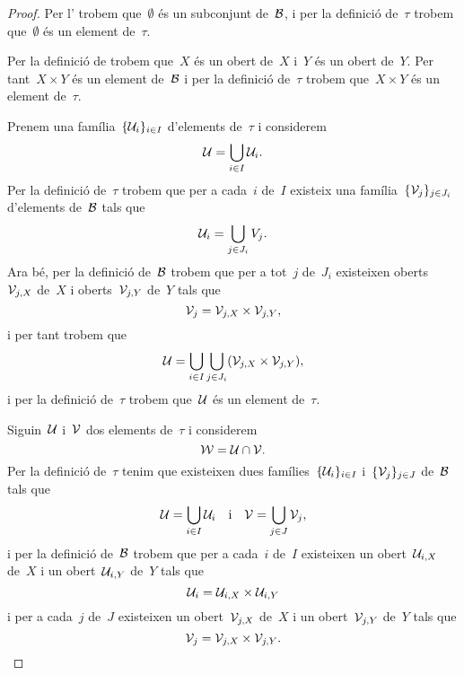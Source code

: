 \documentclass[../../main.tex]{subfiles}
\begin{document}
    \begin{proof}
        Per l' trobem que~\(\emptyset\) és un subconjunt de~\(\mathcal{B}\), i per la definició de~\(\tau\) trobem que~\(\emptyset\) és un element de~\(\tau\).

        Per la definició de  trobem que~\(X\) és un obert de~\(X\) i~\(Y\) és un obert de~\(Y\).
        Per tant~\(X\times Y\) és un element de~\(\mathcal{B}\) i per la definició de~\(\tau\) trobem que~\(X\times Y\) és un element de~\(\tau\).

        Prenem una família~\(\{\mathcal{U}_{i}\}_{i\in I}\) d'elements de~\(\tau\) i considerem
        \[
            \mathcal{U}=\bigcup_{i\in I}\mathcal{U}_{i}.
        \]
        Per la definició de~\(\tau\) trobem que per a cada~\(i\) de~\(I\) existeix una família~\(\{\mathcal{V}_{j}\}_{j\in J_{i}}\) d'elements de~\(\mathcal{B}\) tals que
        \[
            \mathcal{U}_{i}=\bigcup_{j\in J_{i}}V_{j}.
        \]
        Ara bé, per la definició de~\(\mathcal{B}\) trobem que per a tot~\(j\) de~\(J_{i}\) existeixen oberts~\(\mathcal{V}_{j,X}\) de~\(X\) i oberts~\(\mathcal{V}_{j,Y}\) de~\(Y\) tals que
        \[
            \mathcal{V}_{j}=\mathcal{V}_{j,X}\times\mathcal{V}_{j,Y},
        \]
        i per tant trobem que
        \[
            \obert{U}=\bigcup_{i\in I}\bigcup_{j\in J_{i}}\left(\obert{V}_{j,X}\times\obert{V}_{j,Y}\right),
        \]
        i per la definició de~\(\tau\) trobem que~\(\mathcal{U}\) és un element de~\(\tau\).

        Siguin~\(\mathcal{U}\) i~\(\mathcal{V}\) dos elements de~\(\tau\) i considerem
        \[
            \mathcal{W}=\mathcal{U}\cap\mathcal{V}.
        \]
        Per la definició de~\(\tau\) tenim que existeixen dues famílies~\(\{\mathcal{U}_{i}\}_{i\in I}\) i~\(\{\mathcal{V}_{j}\}_{j\in J}\) de~\(\mathcal{B}\) tals que
        \[
            \mathcal{U}=\bigcup_{i\in I}\mathcal{U}_{i}\quad\text{i}\quad\mathcal{V}=\bigcup_{j\in J}\mathcal{V}_{j},
        \]
        i per la definició de~\(\mathcal{B}\) trobem que per a cada~\(i\) de~\(I\) existeixen un obert~\(\mathcal{U}_{i,X}\) de~\(X\) i un obert~\(\mathcal{U}_{i,Y}\) de~\(Y\) tals que
        \[
            \mathcal{U}_{i}=\mathcal{U}_{i,X}\times\mathcal{U}_{i,Y}
        \]
        i per a cada~\(j\) de~\(J\) existeixen un obert~\(\mathcal{V}_{j,X}\) de~\(X\) i un obert~\(\mathcal{V}_{j,Y}\) de~\(Y\) tals que
        \[
            \mathcal{V}_{j}=\mathcal{V}_{j,X}\times\mathcal{V}_{j,Y}.
        \]


\end{proof}
\end{document}
